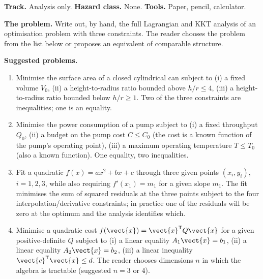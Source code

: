 \begin{project}

\textbf{Track.} Analysis only. \textbf{Hazard class.} None.
\textbf{Tools.} Paper, pencil, calculator.

\textbf{The problem.} Write out, by hand, the full Lagrangian and
KKT analysis of an optimisation problem with three constraints.
The reader chooses the problem from the list below or proposes an
equivalent of comparable structure.

\textbf{Suggested problems.}
\begin{enumerate}[leftmargin=*]
  \item Minimise the surface area of a closed cylindrical can
    subject to (i) a fixed volume $V_{0}$, (ii) a height-to-radius
    ratio bounded above $h/r \leq 4$, (iii) a height-to-radius
    ratio bounded below $h/r \geq 1$. Two of the three constraints
    are inequalities; one is an equality.
  \item Minimise the power consumption of a pump subject to (i) a
    fixed throughput $Q_{0}$, (ii) a budget on the pump cost
    $C \leq C_{0}$ (the cost is a known function of the pump's
    operating point), (iii) a maximum operating temperature
    $T \leq T_{0}$ (also a known function). One equality, two
    inequalities.
  \item Fit a quadratic $f(x) = a x^{2} + b x + c$ through three
    given points $(x_{i}, y_{i})$, $i = 1, 2, 3$, while also
    requiring $f'(x_{1}) = m_{1}$ for a given slope $m_{1}$. The
    fit minimises the sum of squared residuals at the three points
    subject to the four interpolation/derivative constraints; in
    practice one of the residuals will be zero at the optimum and
    the analysis identifies which.
  \item Minimise a quadratic cost $f(\vect{x}) = \vect{x}^{\mathsf{T}}
    Q\vect{x}$ for a given positive-definite $Q$ subject to (i) a
    linear equality $A_{1}\vect{x} = b_{1}$, (ii) a linear equality
    $A_{2}\vect{x} = b_{2}$, (iii) a linear inequality $\vect{c}^{
    \mathsf{T}}\vect{x} \leq d$. The reader chooses dimensions $n$
    in which the algebra is tractable (suggested $n = 3$ or $4$).
\end{enumerate}


\end{project}
